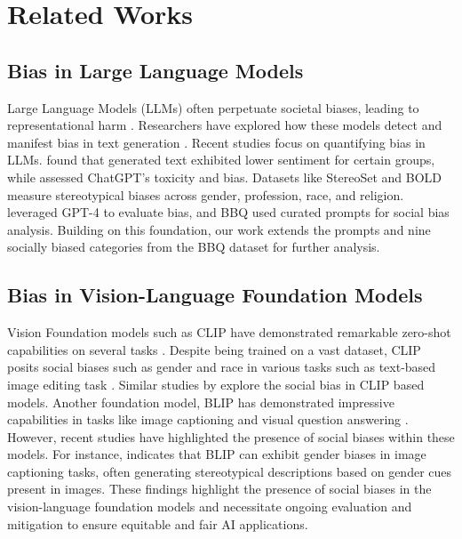 \section{Related Works}

\subsection{Bias in Large Language Models}

Large Language Models (LLMs) often perpetuate societal biases, leading to representational harm \cite{raza2024safe}. Researchers have explored how these models detect and manifest bias in text generation \cite{huang2023cbbq, parrish2021bbq, yeh2023evaluating, dhingra2023queer}. Recent studies focus on quantifying bias in LLMs. \cite{sheng2019woman} found that generated text exhibited lower sentiment for certain groups, while \cite{zhuo2023red} assessed ChatGPT’s toxicity and bias. Datasets like StereoSet \cite{nadeem2020stereoset} and BOLD \cite{dhamala2021bold} measure stereotypical biases across gender, profession, race, and religion. \cite{zhao2023gptbias} leveraged GPT-4 \cite{achiam2023gpt} to evaluate bias, and BBQ \cite{parrish2021bbq} used curated prompts for social bias analysis. Building on this foundation, our work extends the prompts and nine socially biased categories from the BBQ dataset \cite{parrish2021bbq} for further analysis.


\subsection{Bias in Vision-Language Foundation Models}
Vision Foundation models such as CLIP \cite{radford2021learning} have demonstrated remarkable zero-shot capabilities on several tasks \cite{cui2022can, esmaeilpour2022zero, li2022language, subramanian2022reclip}. Despite being trained on a vast dataset, CLIP \cite{radford2021learning} posits social biases such as gender and race \cite{agarwal2021evaluating} in various tasks such as text-based image editing task \cite{tanjim2024discovering}. Similar studies by \cite{berg2022prompt, wang2021gender, wang2022fairclip, wolfe2022american} explore the social bias in CLIP \cite{radford2021learning} based models. Another foundation model, BLIP \cite{li2022blip} has demonstrated impressive capabilities in tasks like image captioning and visual question answering \cite{li2022blip}. However, recent studies have highlighted the presence of social biases within these models. For instance, \cite{yang2024masking} indicates that BLIP can exhibit gender biases in image captioning tasks, often generating stereotypical descriptions based on gender cues present in images. These findings highlight the presence of social biases in the vision-language foundation models and necessitate ongoing evaluation and mitigation to ensure equitable and fair AI applications.

